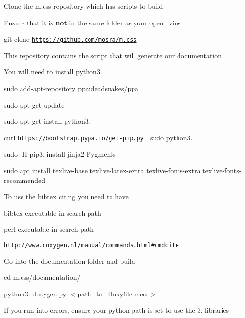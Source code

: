 \begin{DoxyEnumerate}
\item Clone the m.\+css repository which has scripts to build
\begin{DoxyItemize}
\item Ensure that it is {\bfseries not} in the same folder as your open\+\_\+vins
\item {\ttfamily git clone \href{https://github.com/mosra/m.css}{\tt https\+://github.\+com/mosra/m.\+css}}
\item This repository contains the script that will generate our documentation
\end{DoxyItemize}
\item You will need to install python3.
\begin{DoxyItemize}
\item {\ttfamily sudo add-\/apt-\/repository ppa\+:deadsnakes/ppa}
\item {\ttfamily sudo apt-\/get update}
\item {\ttfamily sudo apt-\/get install python3.}
\item {\ttfamily curl \href{https://bootstrap.pypa.io/get-pip.py}{\tt https\+://bootstrap.\+pypa.\+io/get-\/pip.\+py} $\vert$ sudo python3.}
\item {\ttfamily sudo -\/H pip3. install jinja2 Pygments}
\item {\ttfamily sudo apt install texlive-\/base texlive-\/latex-\/extra texlive-\/fonts-\/extra texlive-\/fonts-\/recommended}
\end{DoxyItemize}
\item To use the bibtex citing you need to have
\begin{DoxyItemize}
\item bibtex executable in search path
\item perl executable in search path
\item \href{http://www.doxygen.nl/manual/commands.html#cmdcite}{\tt http\+://www.\+doxygen.\+nl/manual/commands.\+html\#cmdcite}
\end{DoxyItemize}
\item Go into the documentation folder and build
\begin{DoxyItemize}
\item {\ttfamily cd m.\+css/documentation/}
\item {\ttfamily python3. doxygen.\+py $<$path\+\_\+to\+\_\+\+Doxyfile-\/mcss$>$}
\end{DoxyItemize}
\item If you run into errors, ensure your python path is set to use the 3. libraries

\end{DoxyEnumerate}
